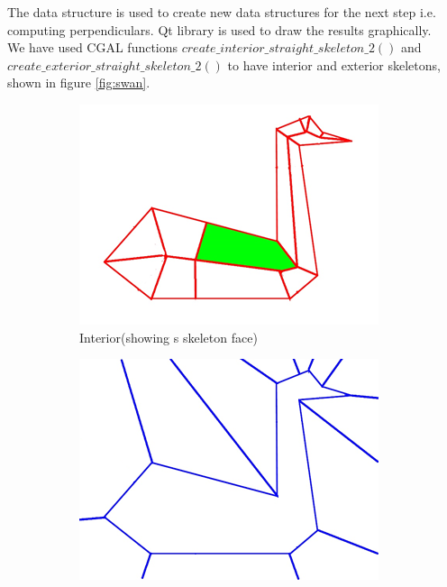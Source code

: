 \documentclass[11pt]{article}
\begin{document}
The data structure is used to create new data structures for the next step i.e. computing perpendiculars. Qt library is used to draw the results graphically.
\\We have used CGAL functions $create\_interior\_straight\_skeleton\_2()$ and $create\_exterior\_straight\_skeleton\_2()$ to have interior and exterior skeletons, shown in figure \ref{fig:swan}.
\begin{figure}[H]
\centering
  \begin{subfigure}[b]{0.4\textwidth}
    \includegraphics[width=\textwidth]{FIGS/Part1/iss}
    \caption{Interior(showing s skeleton face)}
    \label{fig:1}
  \end{subfigure}
  \begin{subfigure}[b]{0.4\textwidth}
    \includegraphics[width=\textwidth]{FIGS/Part1/ess}

\end{subfigure}
\end{figure}
\end{document}
